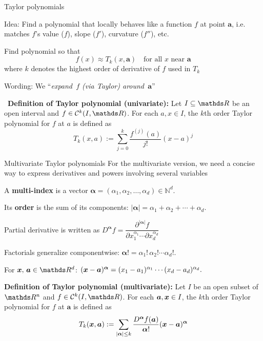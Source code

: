 \documentclass[11pt,compress,t,notes=noshow, xcolor=table]{beamer}
\begin{document}
\begin{framev}{Taylor polynomials}
\begin{itemizeM}
\item Idea: Find a polynomial that locally behaves like a function $f$ at point $\bm{a}$, i.e. matches $f$’s value ($f$), slope ($f'$), curvature ($f''$), etc.
\item[$\Leftrightarrow$] Find polynomial so that 
$$
f(x)\approx T_k(x,\bm{a})\quad \text{for all $x$ near $\bm{a}$} 
$$
where $k$ denotes the highest order of derivative of $f$ used in $T_k$
\item Wording: We ``\textit{expand~$f$ (via Taylor) around~$\bm{a}$}''
\end{itemizeM}\,
\textbf{Definition of Taylor polynomial (univariate):} 
Let $I \subseteq \R$ be an open interval and $f \in \mathcal{C}^k(I,\R)$.
For each $a,x \in I$, the $k$th order Taylor polynomial for $f$ at $a$ is defined as
$$
T_k(x,a):=\sum_{j=0}^k \frac{f^{(j)}(a)}{j!}(x-a)^j
$$
\end{framev}


\begin{framev}{Multivariate Taylor polynomials}
For the multivariate version, we need a concise way to express derivatives and powers involving several variables
\begin{itemizeM}
\item A \textbf{multi-index} is a vector $\bm{\alpha} = (\alpha_1, \alpha_2, \dots, \alpha_d) \in \mathbb{N}^d.$
\item Its \textbf{order} is the sum of its components: $|\bm{\alpha}| = \alpha_1 + \alpha_2 + \cdots + \alpha_d.$
\item Partial derivative is written as $D^{\bm{\alpha}} f = \dfrac{\partial^{|\bm{\alpha}|} f}{\partial x_1^{\alpha_1} \cdots \partial x_d^{\alpha_d}}$
\item Factorials generalize componentwise: $\bm{\alpha}! = \alpha_1! \, \alpha_2! \cdots \alpha_d!.$
\item For $\xv,\,\bm{a}\in\R^d$: $(\bm{x} - \bm{a})^{\bm{\alpha}} = (x_1 - a_1)^{\alpha_1} \cdots (x_d - a_d)^{\alpha_d}.$
\end{itemizeM}
\textbf{Definition of Taylor polynomial (multivariate):} Let $I$ be an open subset of $\R^n$ and $f \in \mathcal{C}^k(I,\R)$.
For each $\bm{a},\bm{x} \in I$, the $k$th order Taylor polynomial for $f$ at $\bm{a}$ is defined as
$$
T_k(\bm{x}, \bm{a}):=\sum_{|\bm{\alpha}| \le k} \frac{D^{\bm{\alpha}} f(\bm{a})}{{\bm{\alpha}}!} (\bm{x} - \bm{a})^{\bm{\alpha}}
$$
\end{framev}
\end{document}
